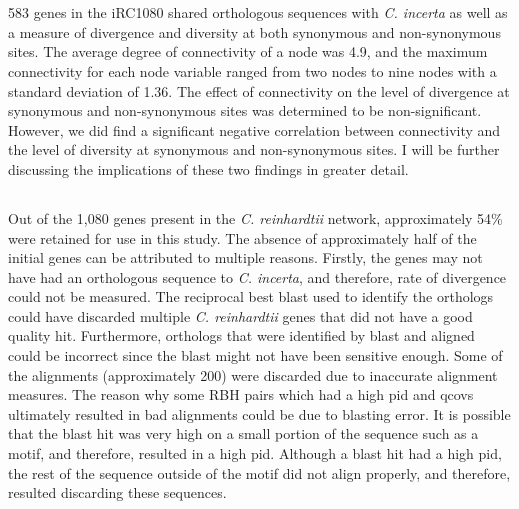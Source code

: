\documentclass[letterpaper, 10 pt, conference]{ieeeconf}  %
\begin{document}
\section*{}


583 genes in the iRC1080 shared orthologous sequences with \textit{C. incerta} as well as a measure of divergence and diversity at both synonymous and non-synonymous sites. The average degree of connectivity of a node was 4.9, and the maximum connectivity for each node variable ranged from two nodes to nine nodes with a standard deviation of 1.36. The effect of connectivity on the level of divergence at synonymous and non-synonymous sites was determined to be non-significant. However, we did find a significant negative correlation between connectivity and the level of diversity at synonymous and non-synonymous sites. I will be further discussing the implications of these two findings in greater detail.


\subsection*{}
Out of the 1,080 genes present in the \textit{C. reinhardtii} network, approximately 54\% were retained for use in this study. The absence of approximately half of the initial genes can be attributed to multiple reasons. Firstly, the genes may not have had an orthologous sequence to \textit{C. incerta}, and therefore, rate of divergence could not be measured. The reciprocal best blast used to identify the orthologs could have discarded multiple \textit{C. reinhardtii} genes that did not have a good quality hit. Furthermore, orthologs that were identified by blast and aligned could be incorrect since the blast might not have been sensitive enough. Some of the alignments (approximately 200) were discarded due to inaccurate alignment measures. The reason why some RBH pairs which had a high pid and qcovs ultimately resulted in bad alignments could be due to blasting error. It is possible that the blast hit was very high on a small portion of the sequence such as a motif, and therefore, resulted in a high pid. Although a blast hit had a high pid, the rest of the sequence outside of the motif did not align properly, and therefore, resulted discarding these sequences. 
\end{document}
